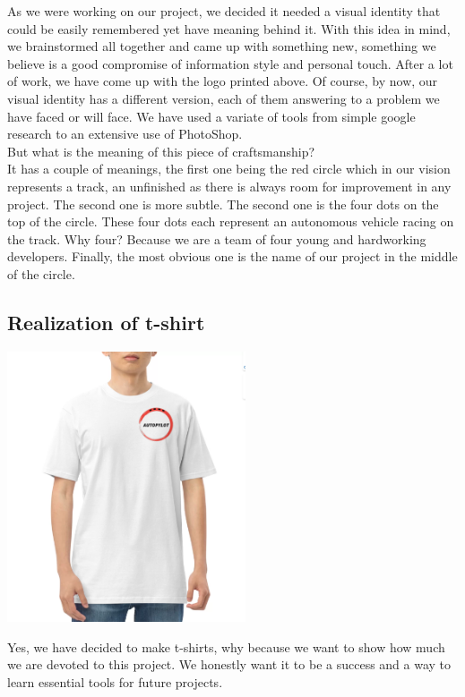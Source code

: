\documentclass[12pt]{article}
\begin{document}
As we were working on our project, we decided it needed a visual identity that could be easily remembered yet have meaning behind it. With this idea in mind, we brainstormed all together and came up with something new, something we believe is a good compromise of information style and personal touch. After a lot of work, we have come up with the logo printed above. Of course, by now, our visual identity has a different version, each of them answering to a problem we have faced or will face. We have used a variate of tools from simple google research to an extensive use of PhotoShop.\\

But what is the meaning of this piece of craftsmanship?\\

It has a couple of meanings, the first one being the red circle which in our vision represents a track, an unfinished as there is always room for improvement in any project. The second one is more subtle. The second one is the four dots on the top of the circle. These four dots each represent an autonomous vehicle racing on the track. Why four? Because we are a team of four young and hardworking developers. Finally, the most obvious one is the name of our project in the middle of the circle. 

\subsection{Realization of t-shirt}
\centerline{\includegraphics[height=8cm]{../../t-shirts/white_t-shirt.png}}
Yes, we have decided to make t-shirts, why because we want to show how much we are devoted to this project. We honestly want it to be a success and a way to learn essential tools for future projects.\\ 
\end{document}
